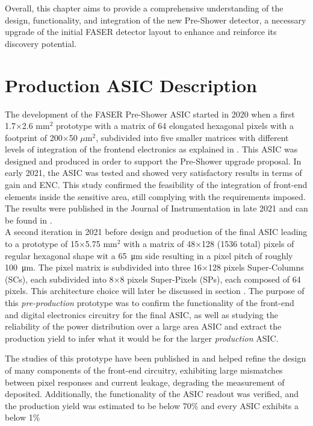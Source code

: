 Overall, this chapter aims to provide a comprehensive understanding of the design, functionality, and integration of the new Pre-Shower detector, a necessary upgrade of the initial FASER detector layout to enhance and reinforce its discovery potential.
	\clearpage 
	\section{Production ASIC Description }
	The development of the FASER Pre-Shower ASIC started in 2020 when a first 1.7$\times$2.6 mm$^2$ prototype with a matrix of 64 elongated hexagonal pixels with a footprint of 200$\times$50 $\mu$m$^2$, subdivided into five smaller matrices with different levels of integration of the frontend electronics as explained in \cite{FASER_proto0}. This ASIC was designed and produced in order to support the Pre-Shower upgrade proposal. In early 2021, the ASIC was tested and showed very satisfactory results in terms of gain and ENC. This study confirmed the feasibility of the integration of front-end elements inside the sensitive area, still complying with the requirements imposed. The results were published in the Journal of Instrumentation in late 2021 and can be found in \cite{FASER_proto0}. \\
	
	A second iteration in 2021 before design and production of the final ASIC leading to a prototype of 15$\times$5.75 mm$^2$ with a matrix of 48$\times$128 (1536 total) pixels of regular hexagonal shape wit a \SI{65}{\micro\meter} side resulting in a pixel pitch of roughly \SI{100}{\micro\meter}. The pixel matrix is subdivided into three 16$\times$128 pixels Super-Columns (SCs), each subdivided into 8$\times$8 pixels Super-Pixels (SPs), each composed of 64 pixels. This architecture choice will later be discussed in section . The purpose of this \textit{pre-production} prototype was to confirm the functionality of the front-end and digital electronics circuitry for the final ASIC, as well as studying the reliability of the power distribution over a large area ASIC and extract the production yield to infer what it would be for the larger \textit{production} ASIC. 
	
	The studies of this prototype have been published in  and helped refine the design of many components of the front-end circuitry, exhibiting large mismatches between pixel responses and current leakage, degrading the measurement of deposited. Additionally, the functionality of the ASIC readout was verified, and the production yield was estimated to be below 70\% and every ASIC exhibits a below 1\% %
	
